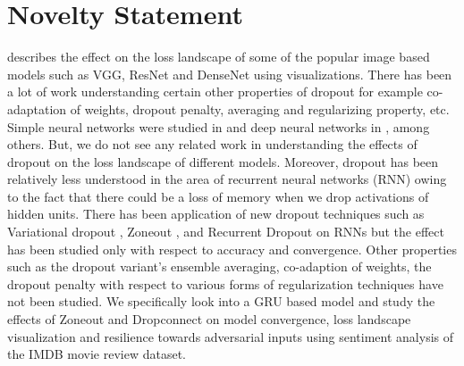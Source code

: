 \documentclass{article}
\begin{document}
\section{Novelty Statement}
\cite{li2018visualizing} describes the effect on the loss landscape of some of the popular image based models such as VGG, ResNet and DenseNet using visualizations. There has been a lot of work understanding certain other properties of dropout for example co-adaptation of weights, dropout penalty, averaging and regularizing property, etc. Simple neural networks were studied in \cite{DBLP:journals/corr/HelmboldL16} and deep neural networks in \cite{conf/nips/BaldiS13}, among others. But, we do not see any related work in understanding the effects of dropout on the loss landscape of different models. Moreover, dropout has been relatively less understood in the area of recurrent neural networks (RNN) owing to the fact that there could be a loss of memory when we drop activations of hidden units. There has been application of new dropout techniques such as Variational dropout \cite{gal2016theoretically}, Zoneout \cite{krueger2017zoneout}, and Recurrent Dropout \cite{semeniuta2016recurrent} on RNNs but the effect has been studied only with respect to accuracy and convergence. Other properties such as the dropout variant's ensemble averaging, co-adaption of weights, the dropout penalty with respect to various forms of regularization techniques have not been studied. We specifically look into a GRU based model and study the effects of Zoneout and Dropconnect \cite{pmlr-v28-wan13} on model convergence, loss landscape visualization and resilience towards adversarial inputs using sentiment analysis of the IMDB movie review dataset.
\end{document}
